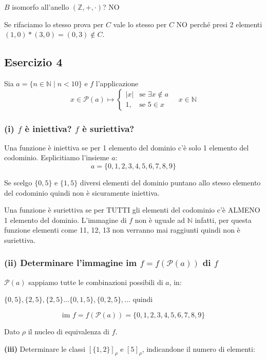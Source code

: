 $B$ isomorfo all'anello $(\mathbb{Z}, +, \cdot)$? NO

Se rifaciamo lo stesso prova per $C$ vale lo stesso per $C$ NO perché presi 2 elementi $(1,0) * (3,0) = (0,3) \notin C$.

\subsection*{Esercizio 4}

Sia $a = \{n \in \mathbb{N} \mid n < 10\}$ e $f$ l'applicazione
$$x \in \mathcal{P}(a) \longmapsto \begin{cases}
|x| & \text{se } \exists x \notin a \\
1, & \text{se } 5 \in x
\end{cases} \quad x \in \mathbb{N}$$

\subsubsection*{(i) $f$ è iniettiva? $f$ è suriettiva?}

Una funzione è iniettiva se per 1 elemento del dominio c'è solo 1 elemento del codominio. Esplicitiamo l'insieme $a$:
$$a = \{0, 1, 2, 3, 4, 5, 6, 7, 8, 9\}$$

Se scelgo $\{0,5\}$ e $\{1,5\}$ diversi elementi del dominio puntano allo stesso elemento del codominio quindi non è sicuramente iniettiva.

Una funzione è suriettiva se per TUTTI gli elementi del codominio c'è ALMENO 1 elemento del dominio. L'immagine di $f$ non è uguale ad $\mathbb{N}$ infatti, per questa funzione elementi come 11, 12, 13 non verranno mai raggiunti quindi non è suriettiva.

\subsubsection*{(ii) Determinare l'immagine im $f = f(\mathcal{P}(a))$ di $f$}

$\mathcal{P}(a)$ sappiamo tutte le combinazioni possibili di $a$, in:

$\{0,5\}, \{2,5\}, \{2,5\} \dots \{0,1,5\}, \{0,2,5\}, \dots$ quindi

$$\text{im } f = f(\mathcal{P}(a)) = \{0, 1, 2, 3, 4, 5, 6, 7, 8, 9\}$$

Dato $\rho$ il nucleo di equivalenza di $f$.

\textbf{(iii)} Determinare le classi $[\{1,2\}]_\rho$ e $[5]_\rho$, indicandone il numero di elementi:

